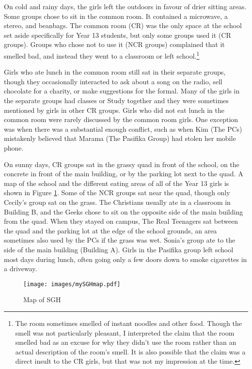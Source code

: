 On cold and rainy days, the girls left the outdoors in favour of drier sitting areas.  Some groups chose to sit in the common room.  It contained a microwave, a stereo, and beanbags.  The common room (CR) was the only space at the school set aside specifically for Year 13 students, but only some groups used it (CR groups).  Groups who chose not to use it (NCR groups) complained that it smelled bad, and instead they went to a classroom or left school.\footnote{The room sometimes smelled of instant noodles and other food.  Though the smell was not particularly pleasant, I interpreted the claim that the room smelled bad as an excuse for why they didn't use the room rather than an actual description of the room's smell.  It is also possible that the claim was a direct insult to the CR girls, but that was not my impression at the time.} 

Girls who ate lunch in the common room still sat in their separate groups, though they occasionally interacted to ask about a song on the radio, sell chocolate for a charity, or make suggestions for the formal.  Many of the girls in the separate groups had classes or Study together and they were sometimes mentioned by girls in other CR groups.  Girls who did not eat lunch in the common room were rarely discussed by the common room girls.  One exception was when there was a substantial enough conflict, such as when Kim (The PCs) mistakenly believed that Marama (The Pasifika Group) had stolen her mobile phone.  

On sunny days, CR groups sat in the grassy quad in front of the school, on the concrete in front of the main building, or by the parking lot next to the quad.  A map of the school and the different eating areas of all of the Year 13 girls is shown in Figure \ref{fig:mySGHmap}.  Some of the NCR groups sat near the quad, though only Cecily's group sat on the grass.  The Christians usually ate in a classroom in Building B, and the Geeks chose to sit on the opposite side of the main building from the quad.  When they stayed on campus, The Real Teenagers sat between the quad and the parking lot at the edge of the school grounds, an area sometimes also used by the PCs if the grass was wet.  Sonia's group ate to the side of the main building (Building A).   Girls in the Pasifika group left school most days during lunch, often going only a few doors down to smoke cigarettes in a driveway.  

\begin{figure}
	\centering
		\texttt{[image: images/mySGHmap.pdf]}
	\caption{Map of SGH}
	\label{fig:mySGHmap}
\end{figure}




